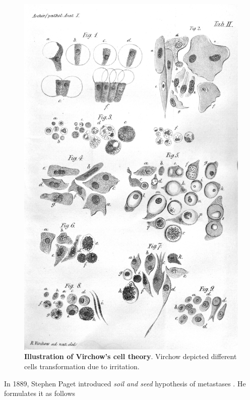 \documentclass[12pt,]{book}
\theoremstyle{definition}
\theoremstyle{definition}
\theoremstyle{definition}
\theoremstyle{remark}
\begin{document}
\begin{figure}

{\centering \includegraphics[width=1\linewidth]{figures-ext/01-Virchow-cell} 

}

\caption{\textbf{Illustration of Virchow's cell
theory}. Virchow depicted different cells transformation due to
irritation. \citep{Virchow1847}}\label{fig:Virchow-cell}
\end{figure}





In 1889, Stephen Paget introduced \emph{soil and seed} hypothesis of
metastases \citep{Paget1889}. He formulates it as follows
\end{document}
